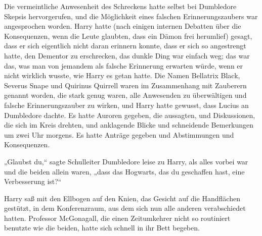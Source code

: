 Die vermeintliche Anwesenheit des Schreckens hatte selbst bei Dumbledore Skepsis hervorgerufen, und die Möglichkeit eines falschen Erinnerungszaubers war angesprochen worden.
Harry hatte (nach einigen internen Debatten über die Konsequenzen, wenn die Leute glaubten, dass ein Dämon frei herumlief) gesagt, dass er sich eigentlich nicht daran erinnern konnte, dass er sich so angestrengt hatte, den Dementor zu erschrecken, das dunkle Ding war einfach weg; das war das, was man von jemandem als falsche Erinnerung erwarten würde, wenn er nicht wirklich wusste, wie Harry es getan hatte.
Die Namen Bellatrix Black, Severus Snape und Quirinus Quirrell waren im Zusammenhang mit Zauberern genannt worden, die stark genug waren, alle Anwesenden zu überwältigen und falsche Erinnerungszauber zu wirken, und Harry hatte gewusst, dass Lucius an Dumbledore dachte. Es hatte Auroren gegeben, die aussagten, und Diskussionen, die sich im Kreis drehten, und anklagende Blicke und schneidende Bemerkungen um zwei Uhr morgens. Es hatte Anträge gegeben und Abstimmungen und Konsequenzen.

„Glaubst du,“ sagte Schulleiter Dumbledore leise zu Harry, als alles vorbei war und die beiden allein waren, „dass das Hogwarts, das du geschaffen hast, eine Verbesserung ist?“

Harry saß mit den Ellbogen auf den Knien, das Gesicht auf die Handflächen gestützt, in dem Konferenzraum, aus dem sich nun alle anderen verabschiedet hatten.
Professor McGonagall, die einen Zeitumkehrer nicht so routiniert benutzte wie die beiden, hatte sich schnell in ihr Bett begeben.

